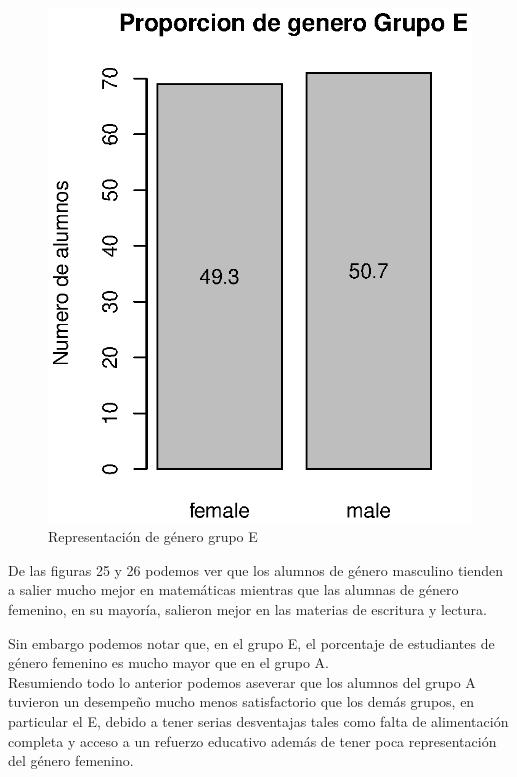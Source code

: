 \documentclass{article}
\begin{document}
\begin{figure}[H]
\begin{minipage}[b]{0.45\linewidth}
            \includegraphics[scale = 0.8]{Output/Plots/figure22.eps}
            \vspace*{-9mm}
            \caption{Representaci\'on de g\'enero grupo E}
            \label{fig:minipage2}
        \end{minipage}
    \end{figure}

    De las figuras 25 y 26 podemos ver que los alumnos de g\'enero masculino tienden a salier mucho mejor
    en matem\'aticas mientras que las alumnas de g\'enero femenino, en su mayor\'ia, salieron mejor
    en las materias de escritura y lectura.

    Sin embargo podemos notar que, en el grupo E, el porcentaje de estudiantes de g\'enero femenino 
    es mucho mayor que en el grupo A.\\

    Resumiendo todo lo anterior podemos aseverar que los alumnos del grupo A tuvieron un desempe\~no
    mucho menos satisfactorio que los dem\'as grupos, en particular el E, debido a tener serias desventajas
    tales como falta de alimentaci\'on completa y acceso a un refuerzo educativo adem\'as de 
    tener poca representaci\'on del g\'enero femenino. 
    
\end{document}
